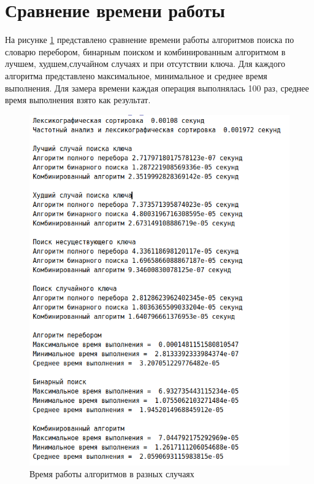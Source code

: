 \documentclass[12pt]{report}
\begin{document}
\section{Сравнение времени работы}
На рисунке \ref{fig:time1} представлено сравнение времени работы алгоритмов поиска по словарю перебором, бинарным поиском и комбинированным алгоритмом в лучшем, худшем,случайном случаях и при отсутствии ключа. Для каждого алгоритма представлено максимальное, минимальное и среднее время выполнения. Для замера времени каждая операция выполнялась 100 раз, среднее время выполнения взято как результат.

\begin{figure}[h]
	\begin{center}
		\includegraphics[scale=0.5]{time1.png}
		\caption{Время работы алгоритмов в разных случаях}
		\label{fig:time1}
	\end{center}
\end{figure}
\end{document}
